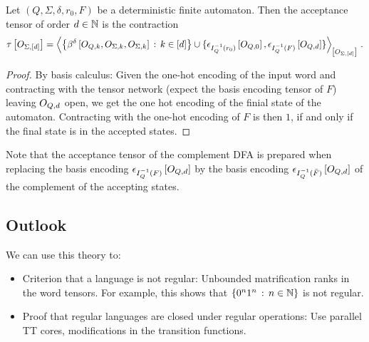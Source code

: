 \begin{lemma}
    Let $(Q,\Sigma,\delta,r_0,F)$ be a deterministic finite automaton.
    Then the acceptance tensor of order $d\in\mathbb{N}$ is the contraction
    \begin{align*}
        \hypercoreat{\indvariableof{\Sigma,[\catorder]}}
        = \contractionof{
            \left\{ \bencodingofat{\delta}{\indvariableof{Q,\catenumerator},\indvariableof{\Sigma,\catenumerator},\indvariableof{\Sigma,\catenumerator}} \wcols \catenumeratorin
            \right\}
            \cup
            \{\onehotmapofat{\invindexinterpretationofat{Q}{r_0}}{\indvariableof{Q,0}},
            \onehotmapofat{\invindexinterpretationofat{Q}{F}}{\indvariableof{Q,\catorder}}
            \}
        }{\indvariableof{\Sigma,[\catorder]}} \, .
    \end{align*}
\end{lemma}
\begin{proof}
    By basis calculus:
    Given the one-hot encoding of the input word and contracting with the tensor network (expect the basis encoding tensor of $F$) leaving $O_{Q,d}$ open, we get the one hot encoding of the finial state of the automaton.
    Contracting with the one-hot encoding of $F$ is then $1$, if and only if the final state is in the accepted states.
\end{proof}

Note that the acceptance tensor of the complement DFA is prepared when replacing the basis encoding $\epsilon_{I_{Q}^{-1}(F)}\left[O_{Q,d}\right]$ by the basis encoding $\epsilon_{I_{Q}^{-1}(\bar{F})}\left[O_{Q,d}\right]$ of the complement of the accepting states.


\subsection{Outlook}

We can use this theory to:
\begin{itemize}
    \item Criterion that a language is not regular: Unbounded matrification ranks in the word tensors.
    For example, this shows that $\{0^n1^n \,:\, n\in\mathbb{N}\}$ is not regular.
    \item Proof that regular languages are closed under regular operations: Use parallel TT cores, modifications in the transition functions.
\end{itemize}